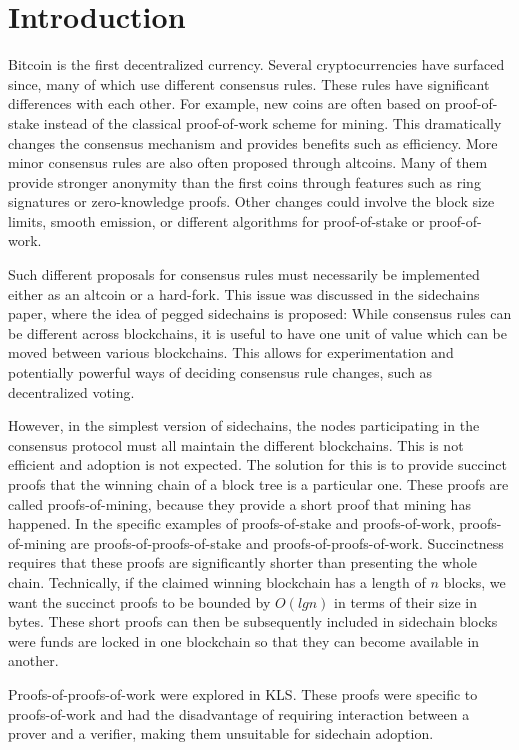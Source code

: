 \section{Introduction}

Bitcoin \cite{bitcoin} is the first decentralized currency. Several
cryptocurrencies have surfaced since, many of which use different consensus
rules. These rules have significant differences with each other. For example,
new coins are often based on proof-of-stake instead of the classical
proof-of-work scheme for mining. This dramatically changes the consensus
mechanism and provides benefits such as efficiency. More minor consensus rules
are also often proposed through altcoins. Many of them provide stronger
anonymity than the first coins through features such as ring signatures or
zero-knowledge proofs. Other changes could involve the block size limits,
smooth emission, or different algorithms for proof-of-stake or proof-of-work.

Such different proposals for consensus rules must necessarily be implemented
either as an altcoin or a hard-fork. This issue was discussed in the sidechains
paper, where the idea of pegged sidechains is proposed: While consensus rules
can be different across blockchains, it is useful to have one unit of value
which can be moved between various blockchains. This allows for experimentation
and potentially powerful ways of deciding consensus rule changes, such as
decentralized voting.

However, in the simplest version of sidechains, the nodes participating in the
consensus protocol must all maintain the different blockchains. This is not
efficient and adoption is not expected. The solution for this is to provide
succinct proofs that the winning chain of a block tree is a particular one.
These proofs are called proofs-of-mining, because they provide a short proof
that mining has happened. In the specific examples of proofs-of-stake and
proofs-of-work, proofs-of-mining are proofs-of-proofs-of-stake and
proofs-of-proofs-of-work. Succinctness requires that these proofs are
significantly shorter than presenting the whole chain. Technically, if the
claimed winning blockchain has a length of $n$ blocks, we want the succinct
proofs to be bounded by $O(lgn)$ in terms of their size in bytes. These short
proofs can then be subsequently included in sidechain blocks were funds are
locked in one blockchain so that they can become available in another.

Proofs-of-proofs-of-work were explored in KLS. These proofs were specific to
proofs-of-work and had the disadvantage of requiring interaction between a
prover and a verifier, making them unsuitable for sidechain adoption.

